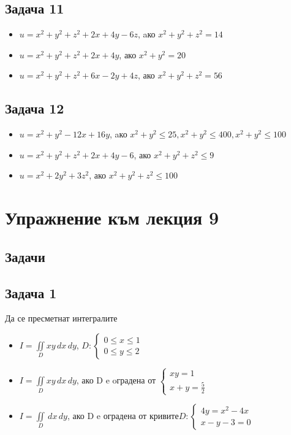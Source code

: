 \documentclass[a4paper,fleqn,12pt]{article}
\theoremstyle{definition}
\begin{document}
\subsection*{Задача 11}

\begin{itemize}
\item $u = x^2 + y^2+ z^2 +2x + 4y -6z $, aко $ x^2 + y^2+ z^2 = 14$
\item $u = x^2 + y^2 + z^2 + 2x + 4y $, ако $x^2 + y^2 = 20$
\item $u = x^2 + y^2+ z^2 +6x - 2y + 4z $, ако $x^2 + y^2+ z^2 = 56$ 
\end{itemize}

\subsection*{Задача 12}

\begin{itemize}
\item $u = x^2 + y^2 - 12x + 16y$, aко $ x^2 + y^2 \leq 25, x^2 + y^2 \leq 400, x^2 + y^2 \leq 100$
\item $u = x^2 + y^2+ z^2 +2x + 4y -6 $, ако $x^2 + y^2 + z^2 \leq 9$
\item $u = x^2 + 2y^2+ 3z^2$, ако $x^2 + y^2+ z^2 \leq 100$ 
\end{itemize}


\newpage 
\section{Упражнение към лекция 9}

\subsection{Задачи}

\subsection*{Задача 1}
Да се пресметнат интегралите
\begin{itemize}
\item $I = \iint\limits_D xy \,dx \,dy$, $D: \begin{cases} 0 \leq x \leq 1 \\ 0 \leq y \leq 2 \end{cases}$
\item $I = \iint\limits _D xy \,dx \,dy$, ако D e oградена от $\begin{cases} xy = 1 \\ x+y = \frac{5}{2} \end{cases}$
\item $I = \iint\limits _D \,dx \,dy$, ако D e оградена от кривите$D: \begin{cases} 4y = x^2 - 4x \\ x - y - 3 = 0 \end{cases}$
\end{itemize}
\end{document}
